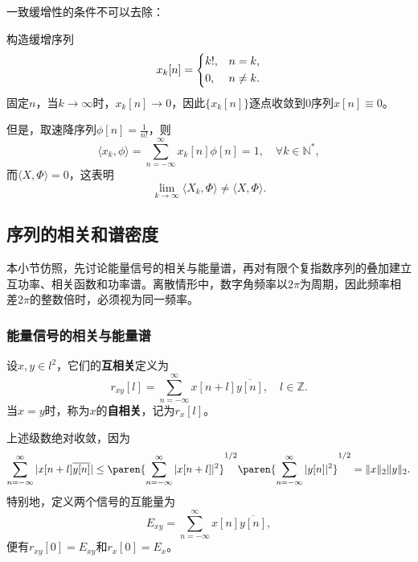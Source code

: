 一致缓增性的条件不可以去除：
\begin{example}
    构造缓增序列
    \begin{equation}
        x_k[n]=\begin{dcases}
            k!, & n=k,    \\
            0,  & n\neq k.
        \end{dcases}
    \end{equation}
    固定$n$，当$k\to\infty$时，$x_k[n]\to 0$，因此$\{x_k[n]\}$逐点收敛到$0$序列$x[n]\equiv 0$。

    但是，取速降序列$\phi[n]=\displaystyle\frac{1}{n!}$，则
    \begin{equation}
        \langle x_k,\phi\rangle=\sum_{n=-\infty}^{\infty}x_k[n]\phi[n]=1,\quad \forall k\in\mathbb{N}^*,
    \end{equation}
    而$\langle X,\Phi\rangle=0$，这表明
    \begin{equation}
        \lim_{k\to\infty}\langle X_k,\Phi\rangle\neq \langle X,\Phi\rangle.
    \end{equation}
\end{example}

\subsection{序列的相关和谱密度}\label{sub:discrete_corr}

本小节仿照，先讨论能量信号的相关与能量谱，再对有限个复指数序列的叠加建立互功率、相关函数和功率谱。离散情形中，数字角频率以$2\pi$为周期，因此频率相差$2\pi$的整数倍时，必须视为同一频率。

\subsubsection{能量信号的相关与能量谱}

\begin{definition}[离散能量信号的相关]\label{def:discrete_correlation_energy}
    设$x,y\in l^2$，它们的\textbf{互相关}定义为
    \begin{equation}
        r_{xy}[l]=\sum_{n=-\infty}^{\infty}x[n+l]\overline{y[n]},\quad l\in\mathbb{Z}.
    \end{equation}
    当$x=y$时，称为$x$的\textbf{自相关}，记为$r_x[l]$。
\end{definition}

上述级数绝对收敛，因为
\begin{equation}
    \sum_{n=-\infty}^{\infty}|x[n+l]\overline{y[n]}|\leq\paren{\sum_{n=-\infty}^{\infty}|x[n+l]|^2}^{1/2}\paren{\sum_{n=-\infty}^{\infty}|y[n]|^2}^{1/2}=\|x\|_2\|y\|_2.
\end{equation}
特别地，定义两个信号的互能量为
\begin{equation}
    E_{xy}=\sum_{n=-\infty}^{\infty}x[n]\overline{y[n]},
\end{equation}
便有$r_{xy}[0]=E_{xy}$和$r_x[0]=E_x$。

